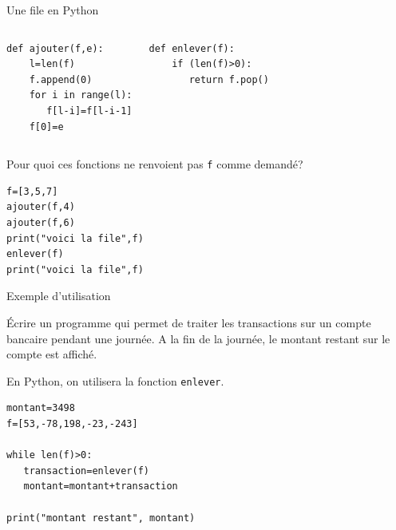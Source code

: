 \documentclass[10pt]{beamer}
\begin{document}
\begin{frame}[fragile]
{Une file en Python}



\begin{exampleblock}{}
\begin{columns}
\column{5 cm}
\vspace{-0.275 cm}
\begin{verbatim}
def ajouter(f,e):
    l=len(f)
    f.append(0)
    for i in range(l):
   	   f[l-i]=f[l-i-1]
    f[0]=e
\end{verbatim}

\column{5 cm}
\vspace{-1.5 cm}
\begin{verbatim}
def enlever(f):
    if (len(f)>0):
       return f.pop()
\end{verbatim}
\end{columns}
\end{exampleblock}

\vspace{0.5 cm}

Pour quoi ces fonctions ne renvoient pas \texttt{f} comme demandé? 
\pause

\begin{exampleblock}{}
\begin{verbatim}
f=[3,5,7]
ajouter(f,4)
ajouter(f,6)    
print("voici la file",f)
enlever(f)
print("voici la file",f)
\end{verbatim}
\end{exampleblock}



\end{frame}





\begin{frame}[fragile]{Exemple d'utilisation}

\'Ecrire un programme qui permet de  traiter les  transactions sur un compte bancaire pendant une journée. 
A la fin de la journée, le montant restant sur le compte est affiché. 


\vspace{0.5 cm}
En Python, on utilisera  la fonction \texttt{enlever}. 


\begin{exampleblock}{}
\begin{verbatim} 
montant=3498
f=[53,-78,198,-23,-243]

while len(f)>0: 
   transaction=enlever(f)
   montant=montant+transaction
   
print("montant restant", montant)    
\end{verbatim}
\end{exampleblock}


\end{frame}
\end{document}
